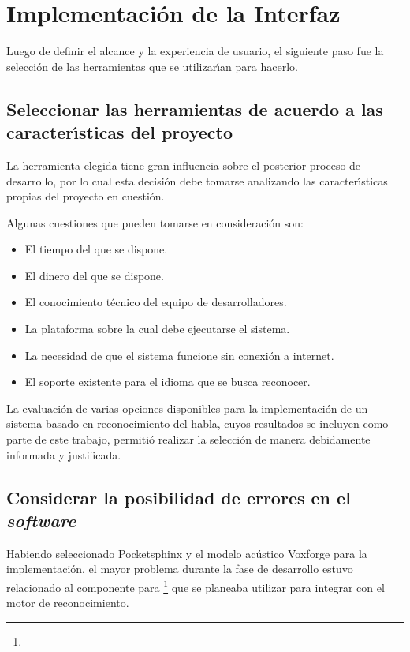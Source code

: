 \section{Implementaci\'on de la Interfaz}
\label{sec:implementacion-interfaz}

Luego de definir el alcance y la experiencia de usuario, el siguiente paso
fue la selecci\'on de las herramientas que se utilizar{\'\i}an para hacerlo. 

\subsection{Seleccionar las herramientas de acuerdo a las \mbox{caracter{\'\i}sticas} del proyecto}
La herramienta elegida tiene gran influencia sobre el posterior proceso de
desarrollo, por lo cual esta decisi\'on debe tomarse analizando las caracter{\'\i}sticas
propias del proyecto en cuesti\'on.

Algunas cuestiones que pueden tomarse en consideraci\'on son:

\begin{itemize}
    \item El tiempo del que se dispone.
    \item El dinero del que se dispone.
    \item El conocimiento t\'ecnico del equipo de desarrolladores.
    \item La plataforma sobre la cual debe ejecutarse el sistema.
    \item La necesidad de que el sistema funcione sin conexi\'on a internet.
    \item El soporte existente para el idioma que se busca reconocer.
\end{itemize}

La evaluaci\'on de varias opciones disponibles para la implementaci\'on de un sistema
basado en reconocimiento del habla, cuyos resultados se incluyen como parte de este
trabajo, permiti\'o realizar la selecci\'on de manera debidamente informada y justificada.

\subsection{Considerar la posibilidad de errores en el \emph{software}}
Habiendo seleccionado Pocketsphinx y el modelo ac\'ustico Voxforge para
la implementaci\'on, el mayor problema durante la fase de desarrollo estuvo relacionado
al componente para  \footnote{}
\cite{GstreamerPocketsphinx} que se planeaba utilizar 
para integrar  con el motor de reconocimiento.

